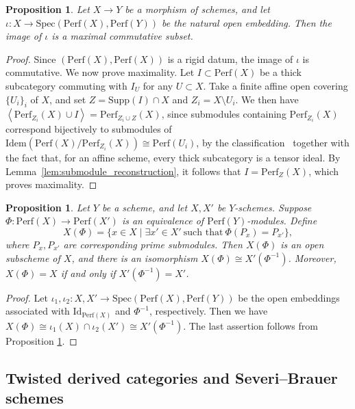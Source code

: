 \documentclass[11pt]{amsart}
\theoremstyle{definition}
\theoremstyle{plain}
\newtheorem{prop}[defn]{Proposition}
\theoremstyle{remark}
\newcommand{\perf}{\mathrm{Perf}}
\newcommand{\Idem}{\mathrm{Idem}}
\newcommand{\Spec}{\mathrm{Spec}}
\newcommand{\Supp}{\mathrm{Supp}}
\newcommand{\Id}{\mathrm{Id}}
\newcommand{\ang}[1]{{\left\langle{#1}\right\rangle}}
\numberwithin{equation}{section}
\begin{document}
\begin{prop}\label{prop:maximal_commutative_subset}
Let \(X\to Y\) be a morphism of schemes, and let \(\iota:X\to \Spec(\perf(X),\perf(Y))\) be the natural open embedding.
Then the image of \(\iota\) is a maximal commutative subset.
\end{prop}

\begin{proof}
Since \((\perf(X),\perf(X))\) is a rigid datum, the image of \(\iota\) is commutative.  
We now prove maximality.  
Let \(I\subset \perf(X)\) be a thick subcategory commuting with \(I_U\) for any \(U\subset X\).  
Take a finite affine open covering \(\{U_i\}_i\) of \(X\), and set \(Z=\Supp(I)\cap X\) and \(Z_i=X\setminus U_i\).  
We then have \(\ang{\perf_{Z_i}(X)\cup I}=\perf_{Z_i\cup Z}(X)\),  
since submodules containing \(\perf_{Z_i}(X)\) correspond bijectively to submodules of \(\Idem(\perf(X)/\perf_{Z_i}(X))\cong \perf(U_i)\), by the classification~\cite[Theorem~3.15]{Th} together with the fact that, for an affine scheme, every thick subcategory is a tensor ideal.  
By Lemma~\ref{lem:submodule_reconstruction}, it follows that \(I=\perf_Z(X)\), which proves maximality.  
\end{proof}


\begin{prop}
Let \(Y\) be a scheme, and let \(X,X'\) be \(Y\)-schemes.
Suppose \(\Phi:\perf(X)\to \perf(X')\) is an equivalence of \(\perf(Y)\)-modules.
Define
\[
X(\Phi)=\{x\in X \mid \exists x'\in X' \ \text{such that}\ \Phi(P_x)=P_{x'}\},
\]
where \(P_x,P_{x'}\) are corresponding prime submodules.
Then \(X(\Phi)\) is an open subscheme of \(X\), and there is an isomorphism \(X(\Phi)\cong X'(\Phi^{-1})\).
Moreover, \(X(\Phi)=X\) if and only if \(X'(\Phi^{-1})=X'\).
\end{prop}

\begin{proof}
Let \(\iota_1,\iota_2:X,X'\to \Spec(\perf(X),\perf(Y))\) be the open embeddings associated with \(\Id_{\perf(X)}\) and \(\Phi^{-1}\), respectively.
Then we have \(X(\Phi)\cong \iota_1(X)\cap \iota_2(X')\cong X'(\Phi^{-1})\).
The last assertion follows from Proposition \ref{prop:maximal_commutative_subset}.
\end{proof}

\subsection{Twisted derived categories and Severi--Brauer schemes}
\end{document}
